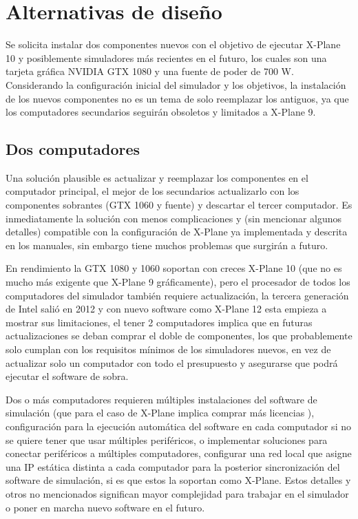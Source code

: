 \section{Alternativas de diseño}

Se solicita instalar dos componentes nuevos con el objetivo de ejecutar X-Plane 10 y posiblemente simuladores más recientes en el futuro, los cuales son una tarjeta gráfica NVIDIA GTX 1080 y una fuente de poder de 700 W. Considerando la configuración inicial del simulador y los objetivos, la instalación de los nuevos componentes no es un tema de solo reemplazar los antiguos, ya que los computadores secundarios seguirán obsoletos y limitados a X-Plane 9.

\subsection{Dos computadores}

Una solución plausible es actualizar y reemplazar los componentes en el computador principal, el mejor de los secundarios actualizarlo con los componentes sobrantes (GTX 1060 y fuente) y descartar el tercer computador. Es inmediatamente la solución con menos complicaciones y (sin mencionar algunos detalles) compatible con la configuración de X-Plane ya implementada y descrita en los manuales, sin embargo tiene muchos problemas que surgirán a futuro.

En rendimiento la GTX 1080 y 1060 soportan con creces X-Plane 10 (que no es mucho más exigente que X-Plane 9 gráficamente), pero el procesador de todos los computadores del simulador también requiere actualización, la tercera generación de Intel salió en 2012 y con nuevo software como X-Plane 12 esta empieza a mostrar sus limitaciones, el tener 2 computadores implica que en futuras actualizaciones se deban comprar el doble de componentes, los que probablemente solo cumplan con los requisitos mínimos de los simuladores nuevos, en vez de actualizar solo un computador con todo el presupuesto y asegurarse que podrá ejecutar el software de sobra.

Dos o más computadores requieren múltiples instalaciones del software de simulación (que para el caso de X-Plane implica comprar más licencias \cite{licencias}), configuración para la ejecución automática del software en cada computador si no se quiere tener que usar múltiples periféricos, o implementar soluciones para conectar periféricos a múltiples computadores, configurar una red local que asigne una IP estática distinta a cada computador para la posterior sincronización del software de simulación, si es que estos la soportan como X-Plane. Estos detalles y otros no mencionados significan mayor complejidad para trabajar en el simulador o poner en marcha nuevo software en el futuro.

